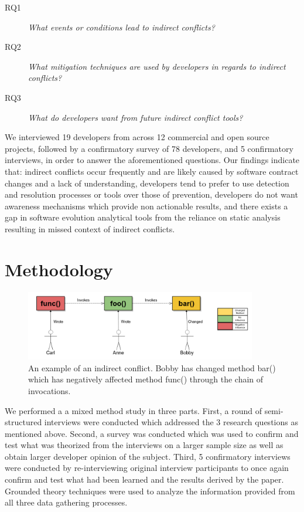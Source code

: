 \documentclass[conference]{IEEEtran}
\makeatletter
\def\namedlabel#1#2{\begingroup
   \def\@currentlabel{#2}%
   \label{#1}\endgroup
}
\makeatother
\begin{document}
\begin{description}
	\item[RQ1\namedlabel{itm:rq1}{RQ1}] \textit{What events or conditions lead to indirect conflicts?}
	\item[RQ2\namedlabel{itm:rq2}{RQ2}] \textit{What mitigation techniques are used by developers in regards to indirect conflicts?}
	\item[RQ3\namedlabel{itm:rq3}{RQ3}] \textit{What do developers want from future indirect conflict tools?}
\end{description}

We interviewed 19 developers from across 12 commercial and open source projects, followed by a confirmatory survey of 78 
developers, and 5 confirmatory interviews, in order to answer the aforementioned questions. Our findings indicate that: 
indirect conflicts occur frequently and are likely caused by software contract changes and a lack of understanding,
developers tend to prefer to use detection and resolution processes or tools
over those of prevention, developers do not want awareness mechanisms which provide non actionable results, 
and there exists a gap in software evolution analytical tools from the reliance on static analysis resulting in missed
context of indirect conflicts.

\section{Methodology}
\label{sec:meth}

\begin{figure}[tb!]
\centering
\includegraphics[width=0.9\textwidth]{images/indirect_conflict.png}
\caption{An example of an indirect conflict. Bobby has changed method bar() which has negatively affected method
func() through the chain of invocations.\label{fig:ic}}
\end{figure}

We performed a a mixed method study in three parts. First, a round of semi-structured interviews were conducted which 
addressed the 3 research questions as mentioned above. Second, a survey was conducted
which was used to confirm and test what was theorized from the interviews on a larger sample size as well as obtain
larger developer opinion of the subject. Third, 5 confirmatory interviews were conducted by re-interviewing original
interview participants to once again confirm and test what had been learned and the results derived by the paper.
Grounded theory techniques were used to analyze the information provided from all three data gathering processes.
\end{document}
